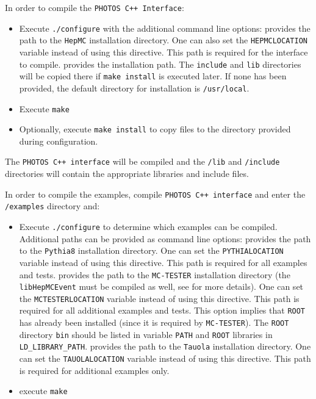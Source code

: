 \documentclass[]{Photos_interface_design}
\begin{document}
In order to compile the {\tt PHOTOS C++ Interface}:
\begin{itemize}
 \item Execute {\tt ./configure} with the additional command line options:
    provides the path to the {\tt HepMC} installation directory. One can also set the {\tt HEPMCLOCATION} variable instead of using this directive. This path is required for the interface to compile.
    provides the installation path. The {\tt include} and {\tt lib} directories will be copied there if {\tt make install} is executed later. If none has been provided, the default directory for installation is {\tt /usr/local}.
 \item Execute {\tt make}
 \item Optionally, execute {\tt make install} to copy files to the directory provided during configuration.
\end{itemize}

The {\tt PHOTOS C++ interface} will be compiled and the {\tt /lib} and {\tt /include} directories will contain the appropriate libraries and include files.

In order to compile the examples, compile {\tt PHOTOS C++ interface} and enter the {\tt /examples} directory and:
\begin{itemize}
  \item Execute {\tt ./configure} to determine which examples can be compiled.
        Additional paths can be provided as command line options:
    provides the path to the {\tt Pythia8} installation
            directory. One can set the {\tt PYTHIALOCATION} variable instead of using this directive.
            This path is required for all examples and tests.
    provides the path to the {\tt MC-TESTER} installation
            directory (the {\tt libHepMCEvent} must be compiled as well, see \cite{Davidson:2008ma}
			for more details). One can set the {\tt MCTESTERLOCATION} variable instead of using this
			directive. This path is required for all additional examples and tests.  This option
			implies that {\tt ROOT} has already been installed (since it is required by {\tt MC-TESTER}).
			The {\tt ROOT} directory {\tt bin} should be listed in variable {\tt PATH} and {\tt ROOT}
			libraries in {\tt LD\_LIBRARY\_PATH}.
    provides the path to the {\tt Tauola} installation directory.
            One can set the {\tt TAUOLALOCATION} variable instead of using this directive.
			This path is required for additional examples only.
  \item execute {\tt make}
\end{itemize}
\end{document}
